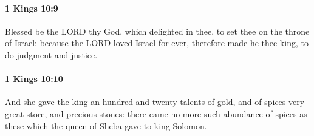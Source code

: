 		\paragraph{1 Kings 10:9} %
			\label{1KINGS-10-9}

			Blessed be the LORD thy God, which delighted in thee, to set thee on the throne of Israel: because the LORD loved Israel for ever, therefore made he thee king, to do judgment and justice.


		\paragraph{1 Kings 10:10} %
			\label{1KINGS-10-10}

			And she gave the king an hundred and twenty talents of gold, and of spices very great store, and precious stones: there came no more such abundance of spices as these which the queen of Sheba gave to king Solomon.

